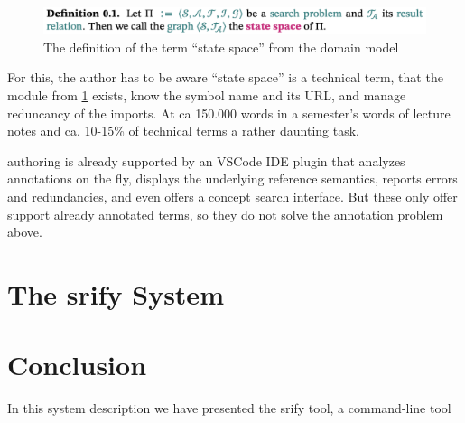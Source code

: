 \documentclass{llncs}
\newcommand\srf{\textsf{srify}\xspace}
\begin{document}
\begin{figure}[ht]\centering
  \includegraphics[width=12cm]{state-space}
  \caption{The definition of the term ``state space'' from the domain model}\label{fig:state-space}
\end{figure}

For this, the author has to be aware ``state space'' is a technical term, that the module
from \cref{fig:state-space} exists, know the symbol name and its URL, and manage
reduncancy of the imports. At ca 150.000 words in a semester's words of lecture notes and
ca. 10-15\% of technical terms a rather daunting task.

\sTeX authoring is already supported by an VSCode IDE plugin \cite{sTeX-IDE:git} that
analyzes annotations on the fly, displays the underlying reference semantics, reports
errors and redundancies, and even offers a concept search interface. But these only offer
support already annotated terms, so they do not solve the annotation problem above.

\section{The \srf System}



\section{Conclusion}

In this system description we have presented the \srf tool, a command-line tool 



\printbibliography
\end{document}
